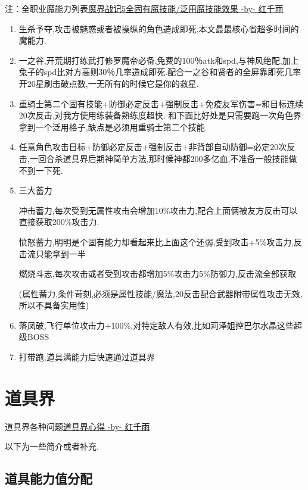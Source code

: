	注：全职业魔能力列表\href{http://tieba.baidu.com/p/3765501530}{魔界战记5全固有魔技能/泛用魔技能效果 -by- 红千雨}

	\begin{enumerate}
		\item
		生杀予夺,攻击被魅惑或者被操纵的角色造成即死,本文最最核心省超多时间的魔能力.
		\item
		一之谷,开荒期打练武打修罗魔帝必备,免费的100％atk和spd,与神风绝配,加上兔子的spd比对方高则30％几率造成即死.配合一之谷和贤者的全屏靠即死几率开20星刷击破点数,一无所有的时候它是你的救星.
		\item
		重骑士第二个固有技能+防御必定反击+强制反击+免疫友军伤害=和目标连续20次反击,对我方使用练装备熟练度超快.
		和下面比好处是只需要跑一次角色界拿到一个泛用格子,缺点是必须用重骑士第二个技能.
		\item
		任意角色攻击目标+防御必定反击+强制反击+非背部自动防御=必定20次反击,一回合杀道具界后期神简单方法,那时候神都200多亿血,不准备一般技能做不到一下死.
		\item
		三大蓄力

		冲击蓄力,每次受到无属性攻击会增加10\%攻击力,配合上面俩被友方反击可以直接获取200\%攻击力.

		愤怒蓄力,明明是个固有能力却看起来比上面这个还弱,受到攻击+5\%攻击力,反击流只能拿到一半

		燃烧斗志,每次攻击或者受到攻击都增加5\%攻击力5\%防御力,反击流全部获取

		(属性蓄力,条件苛刻,必须是属性技能/魔法,20反击配合武器附带属性攻击无效,所以不具备实用性)

		\item
		落凤破,飞行单位攻击力+100\%,对特定敌人有效,比如莉泽姐控巴尔水晶这些超级BOSS

		\item
		打带跑,道具满能力后快速通过道具界

	\end{enumerate}
	
	\newpage

	\section{道具界}

	道具界各种问题\href{http://tieba.baidu.com/p/3730196003}{道具界心得 -by- 红千雨}

	以下为一些简介或者补充.

	\subsection{道具能力值分配}
	
